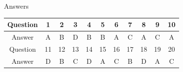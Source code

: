 \documentclass[11pt]{article}
\begin{document}

\begin{scorebox}{Answers}
\begin{center}\renewcommand{\arraystretch}{1.3}
\begin{tabular}{|c|c|c|c|c|c|c|c|c|c|c|}\hline
Question & 1 & 2 & 3 & 4 & 5 & 6 & 7 & 8 & 9 & 10\\\hline
Answer & A & B & D & B & B & A & C & A & C & A\\\hline
Question & 11 & 12 & 13 & 14 & 15 & 16 & 17 & 18 & 19 & 20\\\hline
Answer & D & B & C & D & A & C & B & D & A & C\\\hline
\end{tabular}\end{center}
\end{scorebox}
\end{document}

